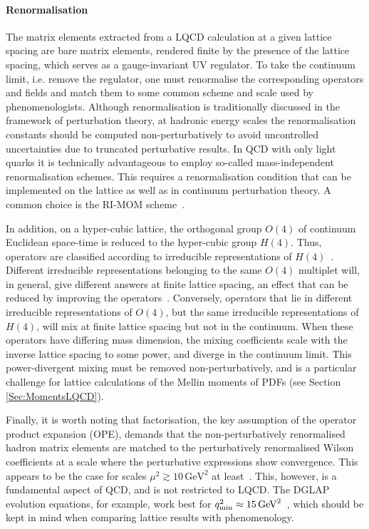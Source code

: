\paragraph{Renormalisation} The matrix elements extracted from a 
LQCD calculation at a given lattice spacing are bare matrix elements,
rendered finite by the presence of the lattice spacing, which serves
as a gauge-invariant UV regulator. To take the continuum limit,
i.e. remove the regulator, one must renormalise the corresponding
operators and fields and match them to some common scheme and scale used 
by phenomenologists. Although renormalisation is traditionally
discussed in the framework of perturbation theory, at hadronic energy
scales the renormalisation constants should be computed
non-perturbatively to avoid uncontrolled uncertainties due to 
truncated perturbative results. In QCD with only light quarks it is technically
advantageous to employ so-called mass-independent renormalisation
schemes. This requires a renormalisation condition that can be
implemented on the lattice as well as in continuum perturbation
theory. A common choice is the RI-MOM scheme~\cite{Martinelli:1994ty}.

In addition, on a hyper-cubic lattice, the orthogonal group $O(4)$ of
continuum Euclidean space-time is reduced to the hyper-cubic group
$H(4)$. Thus, operators are classified according to irreducible
representations of $H(4)$~\cite{Gockeler:1996mu}. Different
irreducible representations belonging to the same $O(4)$ multiplet
will, in general, give different answers at finite lattice spacing, an
effect that can be reduced by improving the
operators~\cite{Gockeler:2004wp}. Conversely, operators that lie in
different irreducible representations of $O(4)$, but the same irreducible
representations of $H(4)$, will mix at finite lattice spacing but not
in the continuum. When these operators have differing mass dimension,
the mixing coefficients scale with the inverse lattice spacing to some
power, and diverge in the continuum limit. This power-divergent mixing
must be removed non-perturbatively, and is a particular challenge for
lattice calculations of the Mellin moments of PDFs (see
Section \ref{Sec:MomentsLQCD}).

Finally, it is worth noting that factorisation, the key assumption of
the operator product expansion (OPE), demands that the
non-perturbatively renormalised hadron matrix elements are matched to the
perturbatively renormalised Wilson coefficients at a scale where the perturbative 
expressions show convergence. This appears to be
the case for scales $\mu^2 \gtrsim 10 \, \mbox{GeV}^2$ at
least~\cite{Gockeler:2010yr}. This, however, is a fundamental aspect
of QCD, and is not restricted to LQCD. The DGLAP evolution equations,
for example, work best for $q^2_{\rm min} \approx
15 \, \mbox{GeV}^2$~\cite{Abramowicz:2015mha}, which should be kept in
mind when comparing lattice results with phenomenology.

